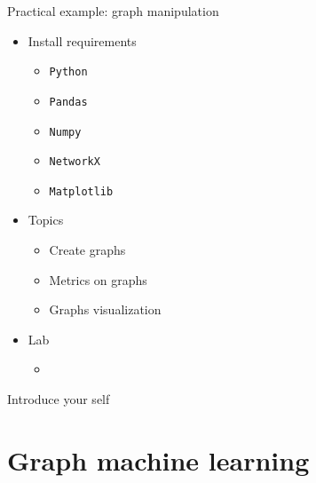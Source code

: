 \documentclass[aspectratio=169]{beamer}
\begin{document}
    \begin{frame}{Practical example: graph manipulation}
        \begin{itemize}
            \item Install requirements
                \begin{itemize}
                    \item \texttt{Python}
                    \item \texttt{Pandas}
                    \item \texttt{Numpy}
                    \item \texttt{NetworkX}
                    \item \texttt{Matplotlib}
                \end{itemize}
            \item Topics 
                \begin{itemize}
                    \item Create graphs
                    \item Metrics on graphs
                    \item Graphs visualization
                \end{itemize}
            \item Lab
                \begin{itemize}
                    \item              
                        \href{https://drive.google.com/file/d/1141_GU2KT_-lBPlyOSLzVTgYGhq_L1tJ/view?usp=sharing}{
                        }
                \end{itemize}
        \end{itemize}

        \begin{note}
            {Introduce your self}
        \end{note}
    \end{frame}

\section{Graph machine learning}
\end{document}
